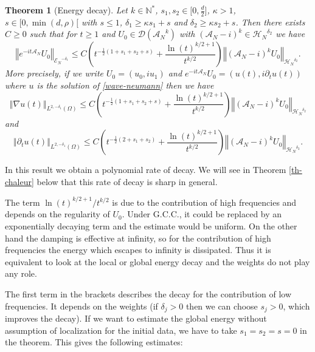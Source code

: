 \documentclass[10pt, a4paper,reqno]{amsart}
\theoremstyle{plain}
\newtheorem{theorem}{{Theorem}}[section]
\theoremstyle{definition}
\theoremstyle{remark}
\begin{document}
\begin{theorem}[Energy decay] \label{th-energy-decay}
Let $k \in {\mathbb{N}}^*$, $s_1,s_2 \in \big[0,\frac d 2]$, ${\kappa} > 1$, $s \in [0,\min(d,\rho)[$ with $s {\leqslant} 1$, ${\delta}_1 {\geqslant}  {\kappa} s_1 + s$ and ${\delta}_2 {\geqslant}  {\kappa} s_2 + s$. Then there exists $C {\geqslant} 0$ such that for $t {\geqslant} 1$ and $U_0 \in {{\mathcal D}}({{{\mathcal A}}_N}^k)$ with $({{{\mathcal A}}_N}-i)^k \in {\mathcal H_N}^{{\delta}_2}$ we have 
\[
{\left\Vert {e^{-it{{{\mathcal A}}_N}} U_0}\right\Vert}_{{\mathscr E_N}^{-{\delta}_1}} {\leqslant} C \left( t^{-\frac 12 (1 + s_1 + s_2 + s)} + \frac {\ln(t)^{k/2+1}} {t^{k/2}} \right) {\left\Vert {({{{\mathcal A}}_N}-i)^k U_0}\right\Vert}_{{\mathcal H_N}^{{\delta}_2}}.
\]
More precisely, if we write $U_0 = (u_0,iu_1)$ and $e^{-it{{{\mathcal A}}_N}} U_0 = (u(t),i\partial_t u(t))$ where $u$ is the solution of \eqref{wave-neumann} then we have
\[
{\left\Vert {\nabla u(t)}\right\Vert}_{L^{2,-{\delta}_1}({\Omega})} {\leqslant} C \left( t^{-\frac 12 (1 + s_1 + s_2 + s)} + \frac {\ln(t)^{k/2+1}} {t^{k/2}} \right) {\left\Vert {({{{\mathcal A}}_N}-i)^k U_0}\right\Vert}_{{\mathcal H_N}^{{\delta}_2}}
\]
and 
\[
{\left\Vert {\partial_t u(t)}\right\Vert}_{L^{2,-{\delta}_1}({\Omega})} {\leqslant} C \left( t^{-\frac 12 (2 + s_1 + s_2 )} + \frac {\ln(t)^{k/2+1}} {t^{k/2}} \right) {\left\Vert {({{{\mathcal A}}_N}-i)^k U_0}\right\Vert}_{{\mathcal H_N}^{{\delta}_2}}.
\]
\end{theorem}

In this result we obtain a polynomial rate of decay. We will see in Theorem \ref{th-chaleur} below that this rate of decay is sharp in general.

The term ${\ln(t)^{k/2+1}} / {t^{k/2}}$ is due to the contribution of high frequencies and depends on the regularity of $U_0$. Under G.C.C., it could be replaced by an exponentially decaying term and the estimate would be uniform. On the other hand the damping is effective at infinity, so for the contribution of high frequencies the energy which escapes to infinity is dissipated. Thus it is equivalent to look at the local or global energy decay and the weights do not play any role.

The first term in the brackets describes the decay for the contribution of low frequencies. It depends on the weights (if ${\delta}_j > 0$ then we can choose $s_j > 0$, which improves the decay). If we want to estimate the global energy without assumption of localization for the initial data, we have to take $s_1 = s_2 = s = 0$ in the theorem. This gives the following estimates:
\end{document}
